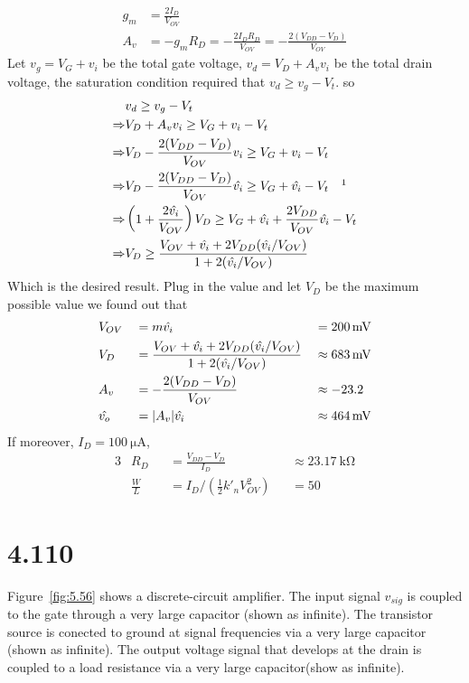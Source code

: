 \documentclass[12pt, a4paper]{article}
\begin{document}
\Ans\\
\begin{align*}
  g_m &= \frac{2I_D}{V_{OV}}\\
  A_v &= -g_m R_D = -\frac{2 I_D R_D}{V_{OV}}  = -\frac{2 (V_{DD} - V_D)}{V_{OV}} 
\end{align*}
Let $v_g = V_G + v_i$ be the total gate voltage, $v_d = V_D + A_v v_i$ be the total drain voltage, the saturation condition required that $v_d \geq v_g - V_t$. so
\begin{align*}
  & v_d \geq v_g - V_t \\
  \Rightarrow & V_D + A_v v_i \geq V_G + v_i - V_t  \\
  \Rightarrow & V_D - \frac{2 (V_{DD} - V_D)}{V_{OV}} v_i \geq V_G + v_i - V_t \\
  \Rightarrow  & V_D - \frac{2 (V_{DD} - V_D)}{V_{OV}} \hat{v_i} \geq V_G + \hat{v_i} - V_t \quad \footnotemark \\
  \Rightarrow & \left(1 + \frac{2\hat{v_i}}{V_{OV}}\right) V_D \geq V_G + \hat{v_i} + \frac{2V_{DD}}{V_{OV}} \hat{v_i}  - V_t  \\
  \Rightarrow & V_D \geq \frac{V_{OV} + \hat{v_i} + 2 V_{DD} (\hat{v_i} / V_{OV}) }{1 + 2(\hat{v_i}/V_{OV})} 
\end{align*}
Which is the desired result.
Plug in the value and let $V_D$ be the maximum possible value we found out that
\begin{alignat*}{3}
  & V_{OV} &&= m \hat{v_i} && = \SI{200}{\mV} \\
  & V_{D} &&= \frac{V_{OV} + \hat{v_i} + 2 V_{DD} (\hat{v_i} / V_{OV}) }{1 + 2(\hat{v_i}/V_{OV})} && \approx \SI{683}{\mV} \\
  & A_v &&= -\frac{2(V_{DD} - V_D)}{V_{OV}}  && \approx -23.2 \\
  & \hat{v_o} &&= \abs{A_v} \hat{v_i} && \approx \SI{464}\mV \\
\end{alignat*}
If moreover, $I_D = \SI{100}{\uA}$,
\begin{alignat*}{3}
  & R_D &&= \frac{V_{DD} - V_D}{I_D}  && \approx \SI{23.17}{\kohm} \\
  & \frac{W}{L} &&= I_D / \left(\frac{1}{2} k'_n V_{OV}^2 \right) && = 50
\end{alignat*}

\section{4.110}
Figure~\ref{fig:5.56} shows a discrete-circuit amplifier. The input signal $v_{sig}$ is coupled to the gate through a very large capacitor (shown as infinite). The transistor source is conected to ground at signal frequencies via a very large capacitor (shown as infinite). The output voltage signal that develops at the drain is coupled to a load resistance via a very large capacitor(show as infinite).
\end{document}
